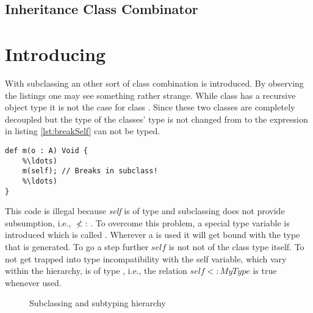 \subsection{Inheritance Class Combinator}

\section{Introducing \mytype}
With subclassing an other sort of class combination is introduced. By
observing the listings  one may see something rather
strange. While class \A has a recursive object type it is not the
case for class \B. Since these two classes are completely decoupled
but the type of the classes' type is not changed from \A to \B
the expression in listing \ref{lst:breakSelf} can not be typed.

\begin{lstlisting}[float,language=ooplss,caption=Illegal method m(o : \A) : \emph{Void} in class \B,label=lst:breakSelf]
def m(o : A) Void {
	%\ldots)
	m(self); // Breaks in subclass!
	%\ldots)
}
\end{lstlisting}

This code is illegal because \emph{self} is of type \B and
subclassing does not provide subsumption, i.e., \B $\nless$:
\A. To overcome this problem, a special type variable is
introduced which is called \mytype. Wherever a \mytype is used it will
get bound with the type that is generated. To go a step further $self$ is not
not of the class type itself. To not get trapped into type incompatibility with
the self variable, which vary within the hierarchy, is of type \mytype, i.e., 
the relation $self <: MyType$ is true whenever used.

\begin{figure}[h]
	\centering
	\caption{Subclassing and subtyping hierarchy}
	\label{fig:hierarchy}
\end{figure}

